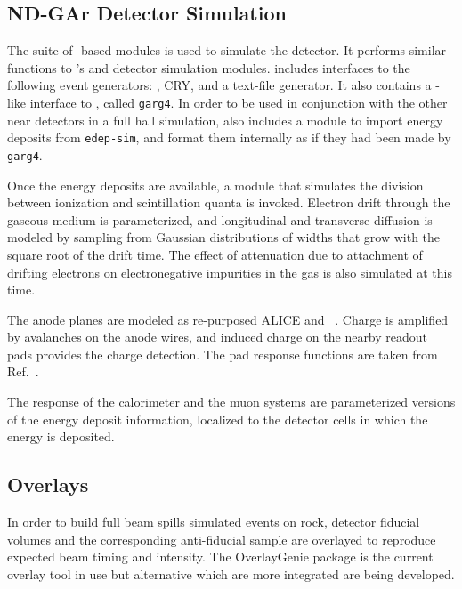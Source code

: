 \documentclass[../main-v1.tex]{subfiles}
\begin{document}
\subsection{ND-GAr Detector Simulation}
\label{sec:usecases_ndgardetsim}

The  suite of -based modules is used to simulate the  detector.  It performs similar functions to 's  and detector simulation modules.   includes interfaces to the following event generators:  , CRY, and a text-file generator.  It also contains a -like interface to , called {\tt garg4}.  In order to be used in conjunction with the other near detectors in a full hall simulation,  also includes a module to import energy deposits from {\tt edep-sim}, and format them internally as if they had been made by {\tt garg4}.

Once the energy deposits are available, a module that simulates the division between ionization and scintillation quanta is invoked.  Electron drift through the gaseous medium is parameterized, and longitudinal and transverse diffusion is modeled by sampling from Gaussian distributions of widths that grow with the square root of the drift time.  The effect of attenuation due to attachment of drifting electrons on electronegative impurities in the gas is also simulated at this time. 

The anode planes are modeled as re-purposed ALICE %
 and  ~\cite{Dellacasa:2000bm}.  Charge is amplified by avalanches on the anode wires, and induced charge on the nearby readout pads provides the charge detection.  The pad response functions are taken from Ref.~\cite{Dellacasa:2000bm}.

The response of the calorimeter and the muon systems are parameterized versions of the energy deposit information, localized to the detector cells in which the energy is deposited.

\subsection{Overlays}
In order to build full beam spills simulated events on rock, detector fiducial volumes and the corresponding anti-fiducial sample are overlayed to reproduce expected beam timing and intensity. The OverlayGenie package is the current overlay tool in use but alternative which are more integrated are being developed. 
\end{document}
